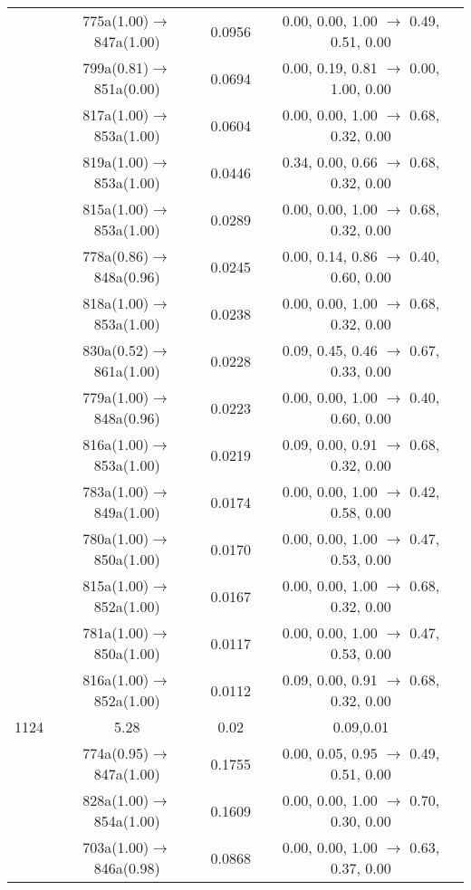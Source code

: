 \documentclass[10pt,a4paper]{article}
\begin{document}
\begin{longtable}{c|c|c|c}
 	& 775a(1.00)$\rightarrow$847a(1.00) &	 0.0956 &	 0.00, 0.00, 1.00 $\rightarrow$ 0.49, 0.51, 0.00 \\ 
 	& 799a(0.81)$\rightarrow$851a(0.00) &	 0.0694 &	 0.00, 0.19, 0.81 $\rightarrow$ 0.00, 1.00, 0.00 \\ 
 	& 817a(1.00)$\rightarrow$853a(1.00) &	 0.0604 &	 0.00, 0.00, 1.00 $\rightarrow$ 0.68, 0.32, 0.00 \\ 
 	& 819a(1.00)$\rightarrow$853a(1.00) &	 0.0446 &	 0.34, 0.00, 0.66 $\rightarrow$ 0.68, 0.32, 0.00 \\ 
 	& 815a(1.00)$\rightarrow$853a(1.00) &	 0.0289 &	 0.00, 0.00, 1.00 $\rightarrow$ 0.68, 0.32, 0.00 \\ 
 	& 778a(0.86)$\rightarrow$848a(0.96) &	 0.0245 &	 0.00, 0.14, 0.86 $\rightarrow$ 0.40, 0.60, 0.00 \\ 
 	& 818a(1.00)$\rightarrow$853a(1.00) &	 0.0238 &	 0.00, 0.00, 1.00 $\rightarrow$ 0.68, 0.32, 0.00 \\ 
 	& 830a(0.52)$\rightarrow$861a(1.00) &	 0.0228 &	 0.09, 0.45, 0.46 $\rightarrow$ 0.67, 0.33, 0.00 \\ 
 	& 779a(1.00)$\rightarrow$848a(0.96) &	 0.0223 &	 0.00, 0.00, 1.00 $\rightarrow$ 0.40, 0.60, 0.00 \\ 
 	& 816a(1.00)$\rightarrow$853a(1.00) &	 0.0219 &	 0.09, 0.00, 0.91 $\rightarrow$ 0.68, 0.32, 0.00 \\ 
 	& 783a(1.00)$\rightarrow$849a(1.00) &	 0.0174 &	 0.00, 0.00, 1.00 $\rightarrow$ 0.42, 0.58, 0.00 \\ 
 	& 780a(1.00)$\rightarrow$850a(1.00) &	 0.0170 &	 0.00, 0.00, 1.00 $\rightarrow$ 0.47, 0.53, 0.00 \\ 
 	& 815a(1.00)$\rightarrow$852a(1.00) &	 0.0167 &	 0.00, 0.00, 1.00 $\rightarrow$ 0.68, 0.32, 0.00 \\ 
 	& 781a(1.00)$\rightarrow$850a(1.00) &	 0.0117 &	 0.00, 0.00, 1.00 $\rightarrow$ 0.47, 0.53, 0.00 \\ 
 	& 816a(1.00)$\rightarrow$852a(1.00) &	 0.0112 &	 0.09, 0.00, 0.91 $\rightarrow$ 0.68, 0.32, 0.00 \\ 
 \hline1124 &	 5.28 &	 0.02 &	 0.09,0.01 \\ 
  	& 774a(0.95)$\rightarrow$847a(1.00) &	 0.1755 &	 0.00, 0.05, 0.95 $\rightarrow$ 0.49, 0.51, 0.00 \\ 
 	& 828a(1.00)$\rightarrow$854a(1.00) &	 0.1609 &	 0.00, 0.00, 1.00 $\rightarrow$ 0.70, 0.30, 0.00 \\ 
 	& 703a(1.00)$\rightarrow$846a(0.98) &	 0.0868 &	 0.00, 0.00, 1.00 $\rightarrow$ 0.63, 0.37, 0.00 \\ 

\end{longtable}
\end{document}
